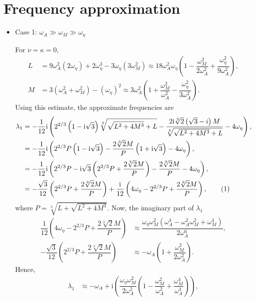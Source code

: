 \documentclass[12pt,psfig]{article}
\newcommand\numberthis{\addtocounter{equation}{1}\tag{\theequation}}
\begin{document}
\section{Frequency approximation}
\begin{itemize}
\item Case 1: $\omega_A\gg \omega_M \gg \omega_\eta$

For $\nu=\kappa=0$,
\begin{align*}
L&=9 \omega_A^2 (2 \omega_\eta)+2 \omega_\eta^3-3 \omega_\eta \left(3 \omega_M^2\right)\approx 18\omega_A^2\omega_\eta\left(1-\dfrac{\omega_M^2}{2\omega_A^2}+\dfrac{\omega_\eta^2}{9\omega_A^2}\right),\\
M&=3 \left(\omega_A^2+\omega_M^2\right)-(\omega_\eta)^2\approx 3\omega_A^2\left(1+\dfrac{\omega_M^2}{\omega_A^2}-\dfrac{\omega_\eta^2}{3\omega_A^2}\right).
\end{align*}
Using this estimate, the approximate frequencies are
\begin{align*}
\lambda_1&=-\dfrac{1}{12} \mathrm{i} \left(2^{2/3} \left(1-\mathrm{i} \sqrt{3}\right) \sqrt[3]{\sqrt{L^2+4 M^3}+L}-\dfrac{2 \mathrm{i} \sqrt[3]{2} \left(\sqrt{3}-i\right) M}{\sqrt[3]{\sqrt{L^2+4 M^3}+L}}-4 \omega_\eta\right),\\
&=-\dfrac{1}{12} \mathrm{i} \left(2^{2/3}P \left(1-\mathrm{i} \sqrt{3}\right) -\dfrac{2  \sqrt[3]{2}  M}{P}\left(1+\mathrm{i}\sqrt{3}\right)-4 \omega_\eta\right),\\
&=-\dfrac{1}{12} \mathrm{i} \left(2^{2/3}P-\mathrm{i} \sqrt{3}\left(2^{2/3}P+\dfrac{2  \sqrt[3]{2}  M}{P}\right) -\dfrac{2  \sqrt[3]{2}  M}{P}-4 \omega_\eta\right),\\
&= -\dfrac{\sqrt{3}}{12}\left(2^{2/3}P+\dfrac{2\sqrt[3]{2}M}{P}\right)+\dfrac{\mathrm{i}}{12}\left(4\omega_\eta-2^{2/3}P+\dfrac{2\sqrt[3]{2}M}{P}\right), \numberthis \label{l1decomp}
\end{align*}
where $P=\sqrt[3]{L+\sqrt{L^2+4M^3}}$. Now, the imaginary part of $\lambda_1$
\begin{align*}
\dfrac{1}{12}\left(4\omega_\eta-2^{2/3}P+\dfrac{2\sqrt[3]{2}M}{P}\right)&\approx \dfrac{\omega_\eta \omega_M^2 \left(\omega_A^4-\omega_A^2 \omega_M^2+\omega_M^4\right)}{2 \omega_A^6},\\
-\dfrac{\sqrt{3}}{12}\left(2^{2/3}P+\dfrac{2\sqrt[3]{2}M}{P}\right)&\approx -\omega_A\left(1+\dfrac{\omega_M^2}{2\omega_A^2}\right).
\end{align*}
Hence, 
\begin{align*}
\lambda_1&\approx -\omega_A+\mathrm{i}\left(\dfrac{\omega_\eta \omega_M^2}{2 \omega_A^2}\left(1-\dfrac{ \omega_M^2}{\omega_A^2}+\dfrac{\omega_M^4}{\omega_A^4}\right)\right),\\

\end{align*}
\end{itemize}
\end{document}
